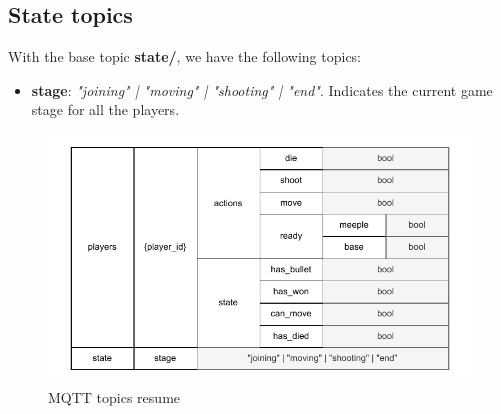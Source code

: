 \documentclass[../main.tex]{subfiles}
\begin{document}
\subsection{State topics}
\label{sec:state-topics}

With the base topic \textbf{state/}, we have the following topics:

\begin{itemize}
    \item \textbf{stage}: \textit{"joining" | "moving" | "shooting" | "end"}. Indicates the current game stage for all the players.
\end{itemize}

\begin{figure}
    \centering
    \includegraphics[width= 0.8\linewidth]{../media/figures/mqtt-topics.pdf}
    \caption{MQTT topics resume}
    \label{fig:mqtt-topics}
\end{figure}
\end{document}
